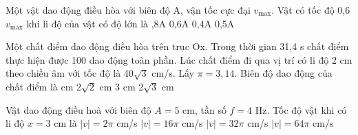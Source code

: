 \setcounter{ex}{0}
\setcounter{paragraph}{0}
\PhanI
\begin{ex}%
Một vật dao động điều hòa với biên độ A, vận tốc cực đại $v_{\max}$. Vật có tốc độ 0,6$v_{\max}$ khi li độ của vật có độ lớn là
\choice
{,8A}
{0,6A}
{0,4A}
{0,5A}

\end{ex} 
\begin{ex}%
Một chất điểm dao động điều hòa trên trục Ox. Trong thời gian 31,4 s chất điểm thực hiện được 100 dao động toàn phần. Lúc chất điểm đi qua vị trí có li độ 2 cm theo chiều âm với tốc độ là 40$\sqrt{3}$ cm/s. Lấy $\pi = 3,14$. Biên độ dao động của chất điểm là
\choice 
{ cm}
{2$\sqrt{2}$ cm}
{3 cm}
{2$\sqrt{3}$ cm}
\end{ex} 
\begin{ex} %
Vật dao động điều hoà với biên độ $A = 5$ cm, tần số $f = 4$ Hz. Tốc độ vật khi có li độ $x = 3$ cm là
\choice 
{$\left|v\right| = 2\pi$ cm/s}
{$\left|v\right|= 16\pi$ cm/s}
{\True $\left|v\right|= 32\pi$ cm/s}
{$\left|v\right|= 64\pi$ cm/s}
\end{ex} 
